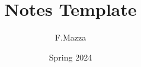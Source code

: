 \documentclass[]{report}
\author{F.Mazza}
\date{Spring 2024}
\title{{Notes Template}}
\begin{document}
	\maketitle
	\tableofcontents

		\newpage

	\begin{appendices}
			\newpage
	\end{appendices}

	
	
\end{document}
